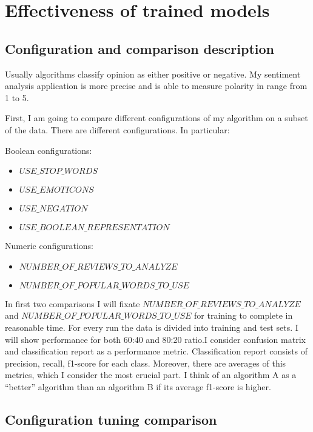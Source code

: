 \documentclass[12pt]{report}
\begin{document}
\newpage

\chapter{Effectiveness of trained models}

\section{Configuration and comparison description}

Usually algorithms classify opinion as either positive or negative. My sentiment analysis application is more precise and is able to measure polarity in range from 1 to 5.

First, I am going to compare different configurations of my algorithm on a subset of the data. There are different configurations. In particular:

Boolean configurations:
\begin{itemize}  
	\item $USE\_STOP\_WORDS$
	\item $USE\_EMOTICONS$
	\item $USE\_NEGATION$ 
	\item $USE\_BOOLEAN\_REPRESENTATION$
\end{itemize}


Numeric configurations:
\begin{itemize}  
	\item $NUMBER\_OF\_REVIEWS\_TO\_ANALYZE$
	\item $NUMBER\_OF\_POPULAR\_WORDS\_TO\_USE$
\end{itemize}

In first two comparisons I will fixate $NUMBER\_OF\_REVIEWS\_TO\_ANALYZE$ and $NUMBER\_OF\_POPULAR\_WORDS\_TO\_USE$ for training to complete in reasonable time. For every run the data is divided into training and test sets. I will show performance for both 60:40 and 80:20 ratio.I consider confusion matrix and classification report as a performance metric. Classification report consists of precision, recall, f1-score for each class. Moreover, there are averages of this metrics, which I consider the most crucial part. I think of an algorithm A as a “better” algorithm than an algorithm B if its average f1-score is higher.

\newpage

\section{Configuration tuning comparison}
\end{document}
